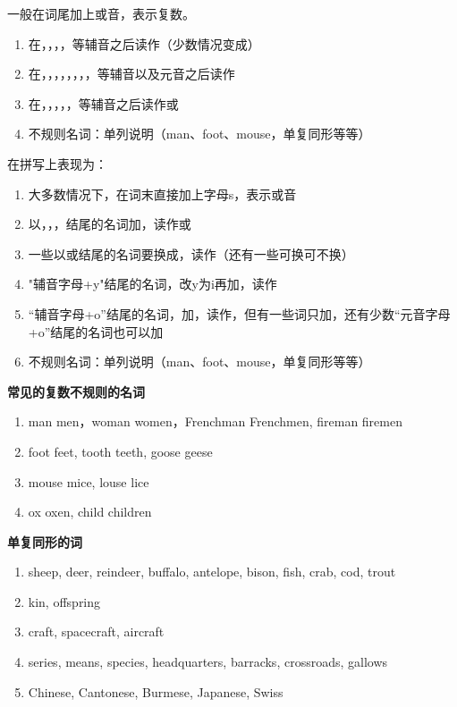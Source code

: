 \documentclass[10.5pt, a4paper]{ctexbook} %
\begin{document}
一般在词尾加上或音，表示复数。
\begin{enumerate}
    \item 在，，，，等辅音之后读作（少数情况变成）
    \item 在，，，，，，，，等辅音以及元音之后读作
    \item 在，，，，，等辅音之后读作或
    \item 不规则名词：单列说明（man、foot、mouse，单复同形等等）
\end{enumerate}

在拼写上表现为：
\begin{enumerate}
    \item 大多数情况下，在词末直接加上字母s，表示或音
    \item 以，，，结尾的名词加，读作或
    \item 一些以或结尾的名词要换成，读作（还有一些可换可不换）
    \item "辅音字母+\;y"结尾的名词，改y为i再加，读作
    \item “辅音字母+\;o”结尾的名词，加，读作，但有一些词只加，还有少数“元音字母+\;o”结尾的名词也可以加
    \item 不规则名词：单列说明（man、foot、mouse，单复同形等等）
\end{enumerate}


\textbf{常见的复数不规则的名词}
\begin{enumerate}
    \item man \warr men，woman \warr women，Frenchman \warr Frenchmen, fireman \warr firemen
    \item foot \warr feet, tooth \warr teeth, goose \warr geese
    \item mouse \warr mice, louse \warr lice
    \item ox \warr oxen, child \warr children
\end{enumerate}

\textbf{单复同形的词}
\begin{enumerate}
    \item sheep, deer, reindeer, buffalo, antelope, bison, fish, crab, cod, trout
    \item kin, offspring
    \item craft, spacecraft, aircraft
    \item series, means, species, headquarters, barracks, crossroads, gallows
    \item Chinese, Cantonese, Burmese, Japanese, Swiss
\end{enumerate}
\end{document}
